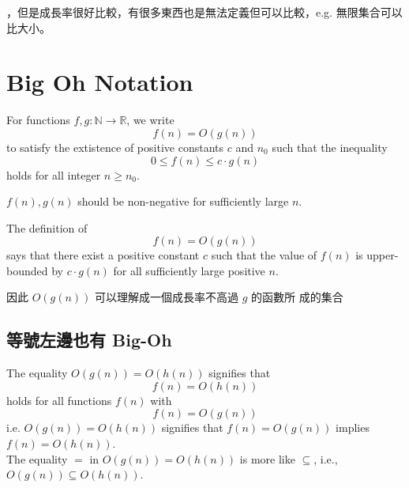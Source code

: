 \begin{definition}
    ，但是成長率很好比較，有很多東西也是無法定義但可以比較，e.g. 無限集合可以比大小。
\end{definition}

\newpage

\section{Big Oh Notation}

\begin{definition}\label{df:1.3.1}
    For functions $f, g : \mathbb{N} \rightarrow \mathbb{R}$, we write
    \[
        f(n) = O(g(n))
    \]
    to satisfy the extistence of positive constants $c$ and $n_0$ such that the inequality
    \[
        0 \leq f(n) \leq c \cdot g(n)
    \]
    holds for all integer $n \geq n_0$.
\end{definition}

\begin{note}
    $f(n), g(n)$ should be non-negative for sufficiently large $n$.
\end{note}

\vspace{1em}

The definition of \[
f(n) = O(g(n))
\]
says that there exist a positive constant $c$ such that the value of $f(n)$ is upper-bounded by $c \cdot g(n)$ for all sufficiently large positive $n$. \\

\begin{remark}
    因此 $O(g(n))$ 可以理解成一個成長率不高過 $g$ 的函數所 成的集合
\end{remark}

\subsection{等號左邊也有 Big-Oh}

\begin{definition}
    The equality $O(g(n)) = O(h(n))$ signifies that
    \[
    f(n) = O(h(n))
    \]
    holds for all functions $f(n)$ with
    \[
    f(n) = O(g(n))
    \]
    i.e. $O(g(n)) = O(h(n))$ signifies that $f(n) = O(g(n))$ implies $f(n) = O(h(n))$.\\

    The equality $=$ in $O(g(n)) = O(h(n))$ is more like $\subseteq$, i.e., $O(g(n)) \subseteq O(h(n))$.
\end{definition}

